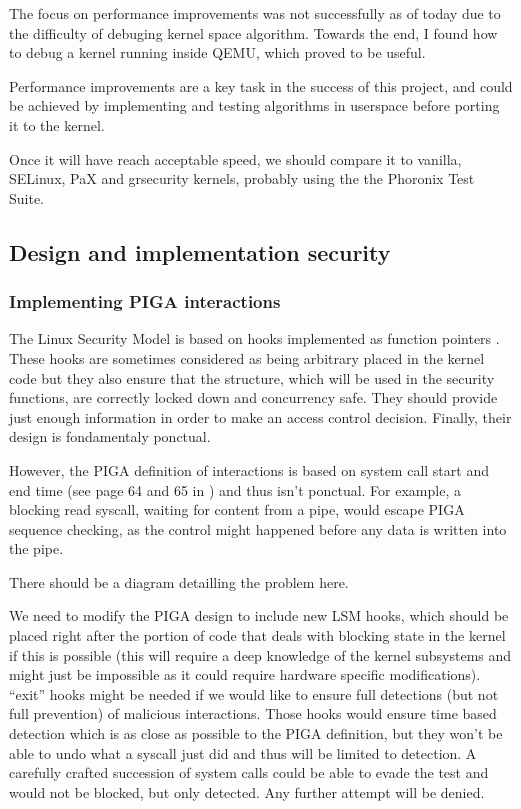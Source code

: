 \documentclass[pdftex,a4paper,titlepage,11pt]{article}
\begin{document}
The focus on performance improvements was not successfully as of today due to
the difficulty of debuging kernel space algorithm. Towards the end, I found
how to debug a kernel running inside QEMU, which proved to be useful.

\bigskip

Performance improvements are a key task in the success of this project, and
could be achieved by implementing and testing algorithms in userspace before
porting it to the kernel.

\bigskip

Once it will have reach acceptable speed, we should compare it to vanilla,
SELinux, PaX and grsecurity kernels, probably using the the Phoronix Test Suite.

\subsection{Design and implementation security}

\subsubsection{Implementing PIGA interactions}

The Linux Security Model is based on hooks implemented as function pointers
\cite{lsm2002linux}. These hooks are sometimes considered as being arbitrary
placed in the kernel code \cite{grsecuritylsm} but they also ensure that the
structure, which will be used in the security functions, are correctly locked
down and concurrency safe. They should provide just enough information in order
to make an access control decision. Finally, their design is fondamentaly
ponctual.

\bigskip

However, the PIGA definition of interactions is based on system call start and
end time (see page 64 and 65 in \cite{theseJBriffaut}) and thus isn't ponctual.
For example, a blocking read syscall, waiting for content from a pipe, would
escape PIGA sequence checking, as the control might happened before any data is
written into the pipe.

\bigskip

There should be a diagram detailling the problem here.

\bigskip

We need to modify the PIGA design to include new LSM hooks, which should be
placed right after the portion of code that deals with blocking state in the
kernel if this is possible (this will require a deep knowledge of the kernel
subsystems and might just be impossible as it could require hardware specific
modifications). ``exit'' hooks might be needed if we would like to ensure full
detections (but not full prevention) of malicious interactions. Those hooks
would ensure time based detection which is as close as possible to the PIGA
definition, but they won't be able to undo what a syscall just did and thus will
be limited to detection. A carefully crafted succession of system calls could be
able to evade the test and would not be blocked, but only detected. Any further
attempt will be denied.
\end{document}

